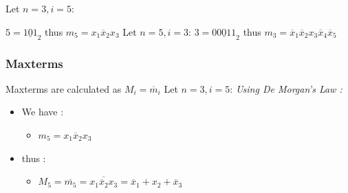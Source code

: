 \documentclass[12pt,openany]{book}
\begin{document}
			      	Let $ n = 3, i = 5$:\newline
			      	
			      	$ 5 = \underline{101}_2$
			      	thus $m_5 = x_1 \overline{x}_2 x_3$ \newline
			      	Let $n=5, i=3$:\newline
			      	$ 3 = \underline{00011}_2$
			      	thus $m_3 = \overline{x}_1 \overline{x}_2 x_3 \overline{x}_4 \overline{x}_5$ \newline
			      	
			      	\newpage
			      	\subsubsection{Maxterms}
			      	Maxterms are calculated as $M_i = \overline{m}_i$ \newline
			      	Let $ n = 3, i = 5$:
			      	\newline \textit{Using De Morgan's Law :}
			      	\begin{itemize}
			      		\item[]We have :
			      		      \begin{itemize}
			      		      	\item[] $m_5 = x_1 \overline{x}_2 x_3$
			      		      \end{itemize}
			      		\item[]thus :
			      		      \begin{itemize}
			      		      	\item[] $M_5 = \overline{m_5} =  \overline{x_1 \overline{x}_2 x_3} = \overline{x}_1 + x_2 + \overline{x}_3$ \newline
			      		      \end{itemize}
			      	\end{itemize}
			      	
\end{document}
